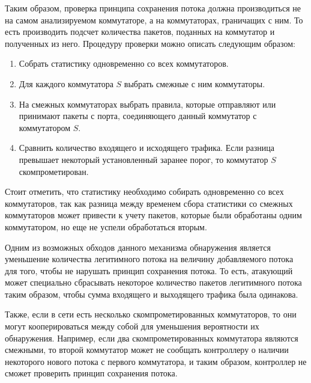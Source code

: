 \documentclass[../thesis.tex]{subfiles}
\begin{document}
Таким образом, проверка принципа сохранения потока должна производиться не на самом анализируемом коммутаторе, а на коммутаторах, граничащих с ним.
То есть производить подсчет количества пакетов, поданных на коммутатор и полученных из него. Процедуру проверки можно описать следующим образом:
\begin{enumerate}
\item Собрать статистику одновременно со всех коммутаторов.
\item Для каждого коммутатора $S$ выбрать смежные с ним коммутаторы.
\item На смежных коммутаторах выбрать правила, которые отправляют или принимают пакеты с порта, соединяющего данный коммутатор с коммутатором $S$.
\item Сравнить количество входящего и исходящего трафика.
Если разница превышает некоторый установленный заранее порог, то коммутатор $S$ скомпрометирован.
\end{enumerate}

Стоит отметить, что статистику необходимо собирать одновременно со всех коммутаторов, так как разница между временем сбора статистики со смежных коммутаторов может привести к учету пакетов, которые были обработаны одним коммутатором, но еще не успели обработаться вторым.

Одним из возможных обходов данного механизма обнаружения является уменьшение количества легитимного потока на величину добавляемого потока для того, чтобы не нарушать принцип сохранения потока.
То есть, атакующий может специально сбрасывать некоторое количество пакетов легитимного потока таким образом, чтобы сумма входящего и выходящего трафика была одинакова.

Также, если в сети есть несколько скомпрометированных коммутаторов, то они могут кооперироваться между собой для уменьшения вероятности их обнаружения.
Например, если два скомпрометированных коммутатора являются смежными, то второй коммутатор может не сообщать контроллеру о наличии некоторого нового потока с первого коммутатора, и таким образом, контроллер не сможет проверить принцип сохранения потока.
\end{document}
